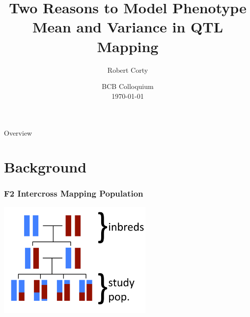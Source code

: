 \documentclass{beamer}
\title{Two Reasons to Model Phenotype\\ Mean and Variance in QTL Mapping}
\author{Robert Corty}
\institute{UNC Chapel Hill}
\date{BCB Colloquium\\\today}
\begin{document}
\begin{frame}
\titlepage
\end{frame}

\begin{frame}{Overview}
\tableofcontents
\end{frame}


\section{Background}

\begin{frame}\frametitle{F2 Intercross Mapping Population}
    \includegraphics[width = 3in]{F2_diagram}
\end{frame}
\end{document}

